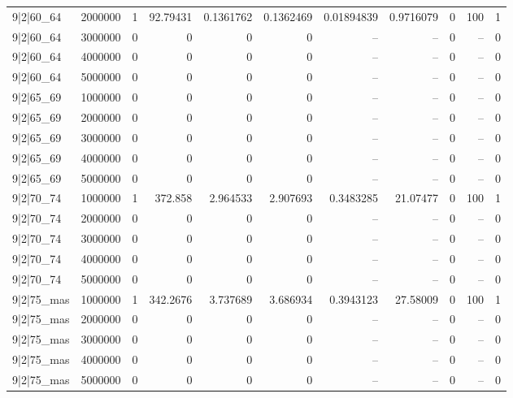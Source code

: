 \begin{tabular}{lrrrrrrrrrr}
9|2|60\_64 & 2000000 & 1 & 92.79431 & 0.1361762 & 0.1362469 & 0.01894839 & 0.9716079 & 0 & 100 & 1 \\
9|2|60\_64 & 3000000 & 0 & 0 & 0 & 0 & -- & -- & 0 & -- & 0 \\
9|2|60\_64 & 4000000 & 0 & 0 & 0 & 0 & -- & -- & 0 & -- & 0 \\
9|2|60\_64 & 5000000 & 0 & 0 & 0 & 0 & -- & -- & 0 & -- & 0 \\
9|2|65\_69 & 1000000 & 0 & 0 & 0 & 0 & -- & -- & 0 & -- & 0 \\
9|2|65\_69 & 2000000 & 0 & 0 & 0 & 0 & -- & -- & 0 & -- & 0 \\
9|2|65\_69 & 3000000 & 0 & 0 & 0 & 0 & -- & -- & 0 & -- & 0 \\
9|2|65\_69 & 4000000 & 0 & 0 & 0 & 0 & -- & -- & 0 & -- & 0 \\
9|2|65\_69 & 5000000 & 0 & 0 & 0 & 0 & -- & -- & 0 & -- & 0 \\
9|2|70\_74 & 1000000 & 1 & 372.858 & 2.964533 & 2.907693 & 0.3483285 & 21.07477 & 0 & 100 & 1 \\
9|2|70\_74 & 2000000 & 0 & 0 & 0 & 0 & -- & -- & 0 & -- & 0 \\
9|2|70\_74 & 3000000 & 0 & 0 & 0 & 0 & -- & -- & 0 & -- & 0 \\
9|2|70\_74 & 4000000 & 0 & 0 & 0 & 0 & -- & -- & 0 & -- & 0 \\
9|2|70\_74 & 5000000 & 0 & 0 & 0 & 0 & -- & -- & 0 & -- & 0 \\
9|2|75\_mas & 1000000 & 1 & 342.2676 & 3.737689 & 3.686934 & 0.3943123 & 27.58009 & 0 & 100 & 1 \\
9|2|75\_mas & 2000000 & 0 & 0 & 0 & 0 & -- & -- & 0 & -- & 0 \\
9|2|75\_mas & 3000000 & 0 & 0 & 0 & 0 & -- & -- & 0 & -- & 0 \\
9|2|75\_mas & 4000000 & 0 & 0 & 0 & 0 & -- & -- & 0 & -- & 0 \\
9|2|75\_mas & 5000000 & 0 & 0 & 0 & 0 & -- & -- & 0 & -- & 0 \\
\bottomrule
\end{tabular}

